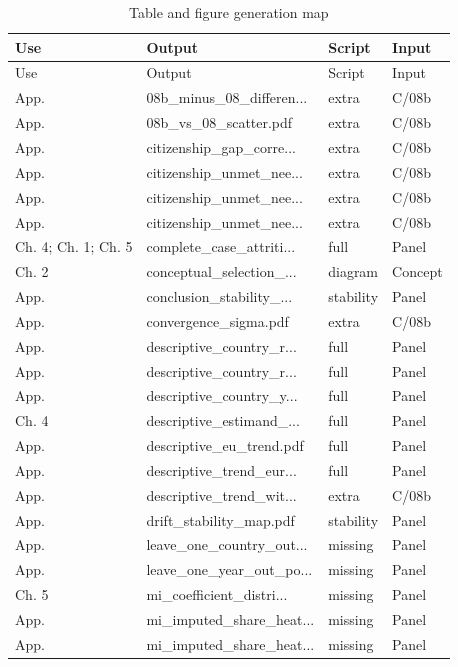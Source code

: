 \begingroup
\tiny
\begin{longtable}{@{}p{}p{}p{}p{}@{}}
\caption{Table and figure generation map}\label{tab:output_generation_map}\\
\toprule
Use & Output & Script & Input \\
\midrule
\endfirsthead
\toprule
Use & Output & Script & Input \\
\midrule
\endhead
App. & 08b\_minus\_08\_differen... & extra & C/08b \\
App. & 08b\_vs\_08\_scatter.pdf & extra & C/08b \\
App. & citizenship\_gap\_corre... & extra & C/08b \\
App. & citizenship\_unmet\_nee... & extra & C/08b \\
App. & citizenship\_unmet\_nee... & extra & C/08b \\
App. & citizenship\_unmet\_nee... & extra & C/08b \\
Ch. 4; Ch. 1; Ch. 5 & complete\_case\_attriti... & full & Panel \\
Ch. 2 & conceptual\_selection\_... & diagram & Concept \\
App. & conclusion\_stability\_... & stability & Panel \\
App. & convergence\_sigma.pdf & extra & C/08b \\
App. & descriptive\_country\_r... & full & Panel \\
App. & descriptive\_country\_r... & full & Panel \\
App. & descriptive\_country\_y... & full & Panel \\
Ch. 4 & descriptive\_estimand\_... & full & Panel \\
App. & descriptive\_eu\_trend.pdf & full & Panel \\
App. & descriptive\_trend\_eur... & full & Panel \\
App. & descriptive\_trend\_wit... & extra & C/08b \\
App. & drift\_stability\_map.pdf & stability & Panel \\
App. & leave\_one\_country\_out... & missing & Panel \\
App. & leave\_one\_year\_out\_po... & missing & Panel \\
Ch. 5 & mi\_coefficient\_distri... & missing & Panel \\
App. & mi\_imputed\_share\_heat... & missing & Panel \\
App. & mi\_imputed\_share\_heat... & missing & Panel \\

\end{longtable}
